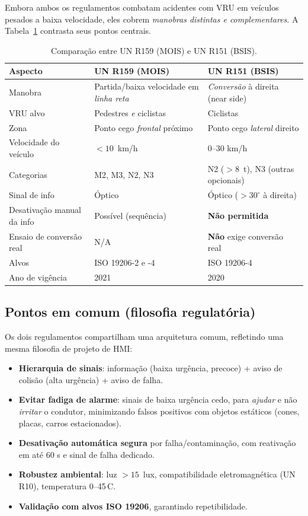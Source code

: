 \documentclass[11pt,a4paper]{article}
\begin{document}
Embora ambos os regulamentos combatam acidentes com VRU em veículos pesados a
baixa velocidade, eles cobrem \emph{manobras distintas e complementares}. A
Tabela~\ref{tab:comp} contrasta seus pontos centrais.

\begin{table}[H]
\centering
\caption{Comparação entre UN R159 (MOIS) e UN R151 (BSIS).}
\label{tab:comp}
\small
\begin{tabularx}{\linewidth}{@{}p{3.2cm}XX@{}}
\toprule
\textbf{Aspecto} & \textbf{UN R159 (MOIS)} & \textbf{UN R151 (BSIS)} \\
\midrule
Manobra & Partida/baixa velocidade em \emph{linha reta} & \emph{Conversão}
à direita (near side) \\
VRU alvo & Pedestres \emph{e} ciclistas & Ciclistas \\
Zona & Ponto cego \emph{frontal} próximo & Ponto cego \emph{lateral} direito \\
Velocidade do veículo & $<10$~km/h & 0--30 km/h \\
Categorias & M2, M3, N2, N3 & N2 ($>8$~t), N3 (outras opcionais) \\
Sinal de info & Óptico & Óptico ($>30^{\circ}$ à direita) \\
Desativação manual da info & Possível (sequência) & \textbf{Não permitida} \\
Ensaio de conversão real & N/A & \textbf{Não} exige conversão real \\
Alvos & ISO 19206-2 e -4 & ISO 19206-4 \\
Ano de vigência & 2021 & 2020 \\
\bottomrule
\end{tabularx}
\end{table}

\subsection{Pontos em comum (filosofia regulatória)}

Os dois regulamentos compartilham uma arquitetura comum, refletindo uma mesma
filosofia de projeto de HMI:

\begin{itemize}[leftmargin=1.4em,itemsep=2pt]
  \item \textbf{Hierarquia de sinais}: informação (baixa urgência, precoce) +
        aviso de colisão (alta urgência) + aviso de falha.
  \item \textbf{Evitar fadiga de alarme}: sinais de baixa urgência cedo, para
        \emph{ajudar} e não \emph{irritar} o condutor, minimizando falsos
        positivos com objetos estáticos (cones, placas, carros estacionados).
  \item \textbf{Desativação automática segura} por falha/contaminação, com
        reativação em até 60 s e sinal de falha dedicado.
  \item \textbf{Robustez ambiental}: luz $>15$~lux, compatibilidade
        eletromagnética (UN R10), temperatura 0--45\,\textdegree C.
  \item \textbf{Validação com alvos ISO 19206}, garantindo repetibilidade.
\end{itemize}
\end{document}
